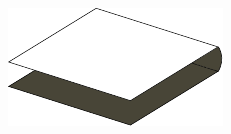 \documentclass{beamer}
\begin{document}
\begin{frame}
\begin{columns}[c]
\includegraphics[width=.9\textwidth]{sam_images/checkerboard-3d.pdf}

\end{columns}

\end{frame}
\end{document}
